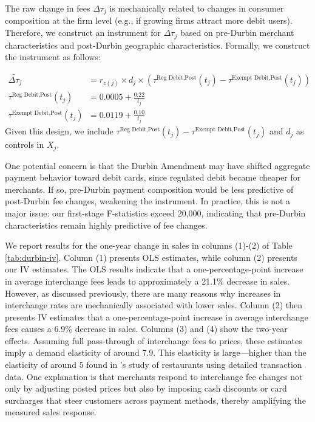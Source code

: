 \documentclass[11pt,english]{article}
\theoremstyle{remark}
\begin{document}
The raw change in fees $\Delta \tau_j$ is mechanically related to changes in consumer composition at the firm level (e.g., if growing firms attract more debit users).
Therefore, we construct an instrument for $\Delta \tau_j$ based on pre-Durbin merchant characteristics and post-Durbin geographic characteristics.
Formally, we construct the instrument as follows:

\begin{align}\widetilde{\Delta\tau_{j}} & = r_{z(j)}\times d_{j}\times\left(\tau^{\text{Reg Debit,Post}}(t_{j})-\tau^{\text{Exempt Debit,Post}}(t_{j})\right) \\
    \tau^{\text{Reg Debit,Post}}(t_{j}) & = 0.0005 + \frac{0.22}{t_j} \\
    \tau^{\text{Exempt Debit,Post}}(t_{j}) & = 0.0119 + \frac{0.10}{t_j}
\end{align}
Given this design, we include $\tau^{\text{Reg Debit,Post}}(t_{j}) - \tau^{\text{Exempt Debit,Post}}(t_{j})$ and $d_j$ as controls in $X_j$.

One potential concern is that the Durbin Amendment may have shifted aggregate payment behavior toward debit cards, since regulated debit became cheaper for merchants.
If so, pre-Durbin payment composition would be less predictive of post-Durbin fee changes, weakening the instrument.
In practice, this is not a major issue: our first-stage F-statistics exceed 20,000, indicating that pre-Durbin characteristics remain highly predictive of fee changes.

We report results for the one-year change in sales in columns (1)-(2) of Table \ref{tab:durbin-iv}.
Column (1) presents OLS estimates, while column (2) presents our IV estimates.
The OLS results indicate that a one-percentage-point increase in average interchange fees leads to approximately a 21.1\% decrease in sales.
However, as discussed previously, there are many reasons why increases in interchange rates are mechanically associated with lower sales.
Column (2) then presents IV estimates that a one-percentage-point increase in average interchange fees causes a 6.9\% decrease in sales.
Columns (3) and (4) show the two-year effects.
Assuming full pass-through of interchange fees to prices, these estimates imply a demand elasticity of around 7.9.
This elasticity is large---higher than the elasticity of around $5$ found in \citet{Sullivan2024}'s study of restaurants using detailed transaction data.
One explanation is that merchants respond to interchange fee changes not only by adjusting posted prices but also by imposing cash discounts or card surcharges that steer customers across payment methods, thereby amplifying the measured sales response.
\end{document}
